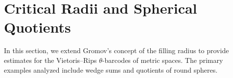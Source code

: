 
\section{Critical Radii and Spherical Quotients}\label{s:barcodes}

In this section, we extend Gromov's concept of the filling radius to provide estimates for the Vietoris--Rips \(\theta\)-barcodes  of metric spaces.
The primary examples analyzed include wedge sums and quotients of round spheres.




